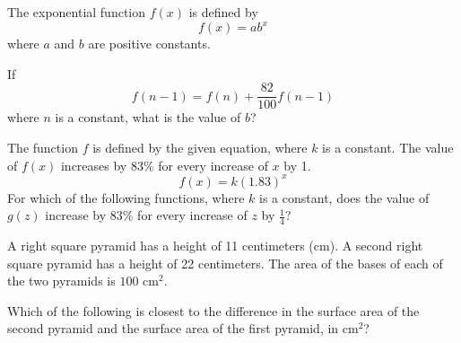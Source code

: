 \noindent\markforreview
\vspace{1em}

The exponential function \(f(x)\) is defined by
\[
f(x) = ab^x
\]
where \(a\) and \(b\) are positive constants.

If
\[
f(n - 1) = f(n) + \frac{82}{100} f(n - 1)
\]
where \(n\) is a constant, what is the value of \(b\)?

\vspace{0.75em}


\vspace{2em}
\newpage

\noindent\markforreview
\vspace{1em}

The function \(f\) is defined by the given equation, where \(k\) is a constant.
The value of \(f(x)\) increases by 83\% for every increase of \(x\) by 1.
\[
f(x) = k(1.83)^x
\]
For which of the following functions, where \(k\) is a constant, does the value of \(g(z)\) increase by 83\% for every increase of \(z\) by \(\frac{1}{4}\)?

\vspace{0.75em}


\vspace{2em}
\newpage

\noindent\markforreview
\vspace{1em}

A right square pyramid has a height of 11 centimeters (cm).
A second right square pyramid has a height of 22 centimeters.
The area of the bases of each of the two pyramids is \(100\text{ cm}^2\).

Which of the following is closest to the difference in the surface area of the second pyramid and the surface area of the first pyramid, in \(\text{cm}^2\)?

\vspace{0.75em}


\vspace{2em}
